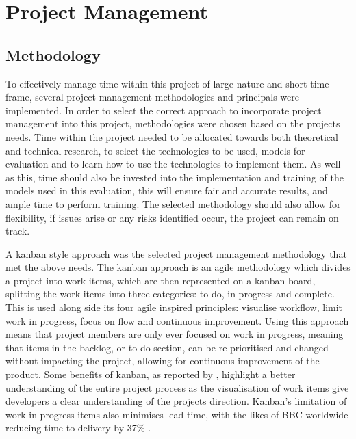 \section{Project Management}
\subsection{Methodology}
To effectively manage time within this project of large nature and short time frame, several project management methodologies and principals were implemented. In order to select the correct approach to incorporate project management into this project, methodologies were chosen based on the projects needs. Time within the project needed to be allocated towards both theoretical and technical research, to select the technologies to be used, models for evaluation and to learn how to use the technologies to implement them. As well as this, time should also be invested into the implementation and training of the models used in this evaluation, this will ensure fair and accurate results, and ample time to perform training. The selected methodology should also allow for flexibility, if issues arise or any risks identified occur, the project can remain on track.

A kanban style approach was the selected project management methodology that met the above needs. The kanban approach is an agile methodology which divides a project into work items, which are then represented on a kanban board, splitting the work items into three categories: to do, in progress and complete. This is used along side its four agile inspired principles: visualise workflow, limit work in progress, focus on flow and continuous improvement. Using this approach means that project members are only ever focused on work in progress, meaning that items in the backlog, or to do section, can be re-prioritised and changed without impacting the project, allowing for continuous improvement of the product. Some benefits of kanban, as reported by \cite{ahmad2013kanban}, highlight a better understanding of the entire project process as the visualisation of work items give developers a clear understanding of the projects direction. Kanban's limitation of work in progress items also minimises lead time, with the likes of BBC worldwide reducing time to delivery by 37\% \citep{senapathi2011factors}.

